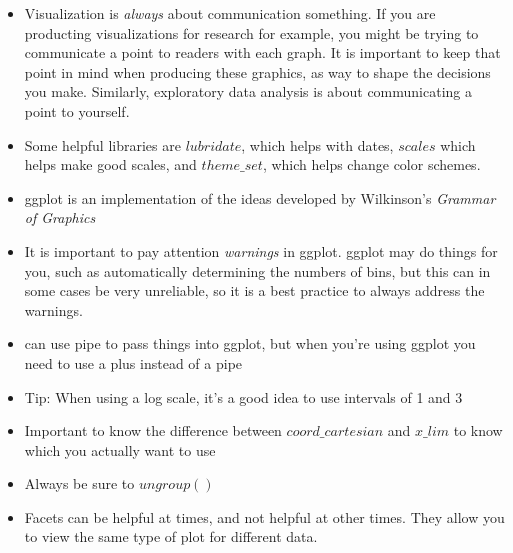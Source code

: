 \begin{itemize}
  \item Visualization is {\it always} about communication something. If you are producting visualizations for research for example, you might be trying to communicate a point to readers with each graph. It is important to keep that point in mind when producing these graphics, as way to shape the decisions you make. Similarly, exploratory data analysis is about communicating a point to yourself. 
  \item Some helpful libraries are $lubridate$, which helps with dates, $scales$ which helps make good scales, and $theme\_set$, which helps change color schemes.
  \item ggplot is an implementation of the ideas developed by Wilkinson's {\it Grammar of Graphics}
  \item It is important to pay attention {\it warnings} in ggplot. ggplot may do things for you, such as automatically determining the numbers of bins, but this can in some cases be very unreliable, so it is a best practice to always address the warnings. 
  \item can use pipe to pass things into ggplot, but when you're using ggplot you need to use a plus instead of a pipe
  \item Tip: When using a log scale, it's a good idea to use intervals of 1 and 3
  \item Important to know the difference between $coord\_cartesian$ and $x\_lim$ to know which you actually want to use
  \item Always be sure to $ungroup()$
  \item Facets can be helpful at times, and not helpful at other times. They allow you to view the same type of plot for different data. 


\end{itemize}

